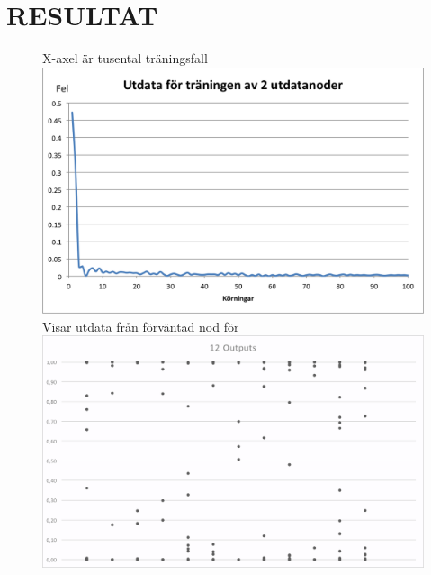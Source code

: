 \documentclass[a4paper,10pt]{article}
\begin{document}
\section{RESULTAT}
\begin{figure}[h!]
X-axel är tusental träningsfall\\
\includegraphics[width=\textwidth]{2outTR}
Visar utdata från förväntad nod för \\
\includegraphics[width=\textwidth]{12_out}
\end{figure}


\end{document}

